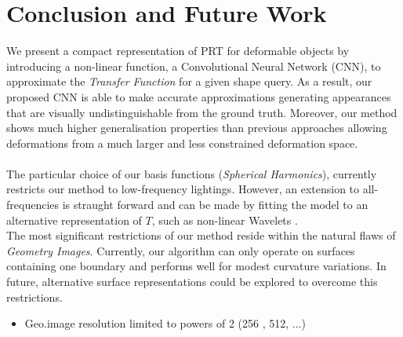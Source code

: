 \section{Conclusion and Future Work}
We present a compact representation of PRT for deformable objects by introducing a non-linear function, a Convolutional Neural Network (CNN), to approximate the \textit{Transfer Function} for a given shape query. As a result, our proposed CNN is able to make accurate approximations generating appearances that are visually undistinguishable from the ground truth. Moreover, our method shows much higher generalisation properties than previous approaches allowing deformations from a much larger and less constrained deformation space.\\
\\
The particular choice of our basis functions (\textit{Spherical Harmonics}), currently restricts our method to low-frequency lightings. However, an extension to all-frequencies is straught forward and can be made by fitting the model to an alternative representation of $T$, such as non-linear Wavelets \cite{AllFrequencyPRT}.\\
The most significant restrictions of our method reside within the natural flaws of \textit{Geometry Images}. Currently, our algorithm can only operate on surfaces containing one boundary and performs well for modest curvature variations. In future, alternative surface representations could be explored to overcome this restrictions.
\begin{itemize}
\item Geo.image resolution limited to powers of 2 (256 , 512, ...)
\end{itemize}
